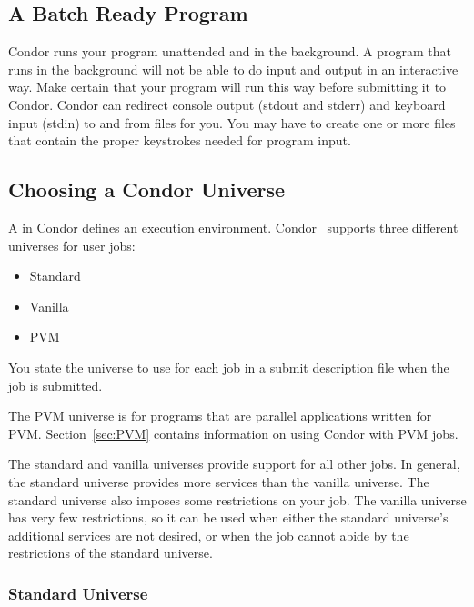 \subsection{A Batch Ready Program}

Condor runs your program unattended and in the background. 
A program that runs in the background will not be able
to do input and output in an interactive way.
Make certain
that your program will run this way before submitting it to Condor.
Condor can
redirect console output (stdout and stderr) and keyboard input (stdin)
to and from files for you.
You may have to create one or more files that contain
the proper keystrokes needed for program input.

\subsection{\label{sec:Choosing-Universe}
Choosing a Condor Universe}

A  in Condor
defines an execution environment. 
Condor \VersionNotice\ supports three different
universes for user jobs:
\begin{itemize}
	\item Standard
	\item Vanilla
	\item PVM
\end{itemize}
You state the universe to use for each job in a
submit description file when the job is submitted. 

The PVM universe is for
programs that are parallel applications written for PVM.
Section~\ref{sec:PVM} contains information on using Condor with PVM jobs.

The standard and vanilla universes provide support for all other jobs.
In general, the standard universe provides more services than
the vanilla universe. 
The standard universe also imposes some restrictions on
your job.
The vanilla universe has very few restrictions, so
it can be used when either the standard universe's additional services are not
desired,  or when the job cannot abide by the restrictions
of the standard universe.

\subsubsection{\label{sec:standard-universe}Standard Universe}

